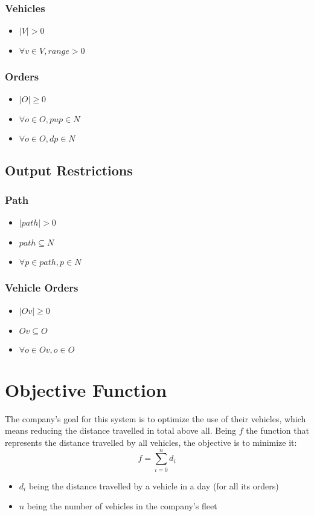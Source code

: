\subsubsection{Vehicles}
\begin{itemize}
    \item $ |V| > 0 $
    \item $ \forall v \in V, range > 0 $
\end{itemize}

\subsubsection{Orders}
\begin{itemize}
    \item $ |O| \geq 0 $
    \item $ \forall o \in O, pup \in N $
    \item $ \forall o \in O, dp \in N $
\end{itemize}


\subsection{Output Restrictions}

\subsubsection{Path}
\begin{itemize}
    \item $ |path| > 0 $
    \item $ path \subseteq N $
    \item $ \forall p \in path, p \in N $
\end{itemize}

\subsubsection{Vehicle Orders}
\begin{itemize}
    \item $ |Ov| \geq 0 $
    \item $ Ov \subseteq O $
    \item $ \forall o \in Ov, o \in O$
\end{itemize}


\section{Objective Function}

The company's goal for this system is to optimize the use of their vehicles, which means reducing the distance travelled in total above all. Being $ f $ the function that represents the distance travelled by all vehicles, the objective is to minimize it:
\[ f = \sum_{i=0}^n d_i \]
\begin{itemize}
    \item $ d_i $ being the distance travelled by a vehicle in a day (for all its orders)
    \item $ n $ being the number of vehicles in the company's fleet
\end{itemize}

